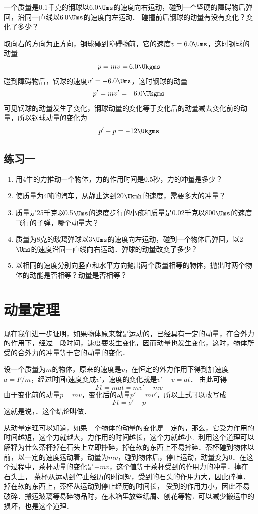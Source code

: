 \begin{example}
    一个质量是0.1千克的钢球以6.0$\Ums$的速度向右运动，碰到一个坚硬的障碍物后弹回，沿同一直线以6.0$\Ums$的速度向左运动．
    碰撞前后钢球的动量有没有变化？变化了多少？
\end{example}


\begin{solution}
    取向右的方向为正方向，钢球碰到障碍物前，它的速度$v=6.0\Ums$，这时钢球的动量
\[p=mv=6.0 \Ukgms\]
碰到障碍物后，钢球的速度$v'=-6.0\Ums$，这时钢球的动量
\[p'=mv'=-6.0\Ukgms\]
可见钢球的动量发生了变化，钢球动量的变化等于变化后的动量减去变化前的动量，所以钢球动量的变化为
\[p'-p=-12\Ukgms \]
\end{solution}

\subsection*{练习一}
\begin{enumerate}
    \item 用4牛的力推动一个物体，力的作用时间是0.5秒，力的冲量是多少？
    \item 使质量为4吨的汽车，从静止达到20$\Ukmh$的速度，需要多大的冲量？
    \item 质量是25千克以0.5$\Ums$的速度步行的小孩和质量是0.02千克以800$\Ums$的速度飞行的子弹，哪个动量大？
    \item 质量为8克的玻璃弹球以3$\Ums$的速度向左运动，碰到一个物体后弹回，以2$\Ums$的速度沿同一直线向右运动．弹球的动量改变了多少？
    \item 以相同的速度分别向竖直和水平方向抛出两个质量相等的物体，抛出时两个物体的动能是否相等？动量是否相等？
\end{enumerate}

\section{动量定理}
现在我们进一步证明，如果物体原来就是运动的，已经具有一定的动量，在合外力的作用下，经过一段时间，速度要发生变化，因而动量也发生变化，这时，物体所受的合外力的冲量等于它的动量的变化．

设一个质量为$m$的物体，原来的速度是$v$，在恒定的外力作用下得到加速度$a=F/m$，经过时间$t$速度变成$v'$，速度的变化就是$v'-v=at$．
由此可得
\[Ft=mat=mv'-mv\]
由于变化前的动量$p=mv$，变化后的动量$p'=mv'$，所以上式可以改写成
\[Ft=p'-p\]
这就是说，．这个结论叫做．

从动量定理可以知道，如果一个物体的动量的变化是一定的，那么，它受力作用的时间越短，这个力就越大，力作用的时间越长，这个力就越小．利用这个道理可以解释为什么茶杯掉在石头上立即摔碎，掉在软的东西上不易摔碎．茶杯碰到物体以前，以一定的速度运动着，动量为$mv$，碰到物体后，停止运动，动量变为0．在这个过程中，茶杯动量的变化是$-mv$，这个值等于茶杯受到的作用力的冲量．掉在石头上，
茶杯从运动到停止经历的时间短，受到的石头的作用力大，因此碎掉．掉在软的东西上，茶杯从运动到停止经历的时间长，
受到的作用力小，因此不易破碎．搬运玻璃等易碎物品时，在木箱里放些纸屑、刨花等物，可以减少搬运中的损坏，也是这个道理．

